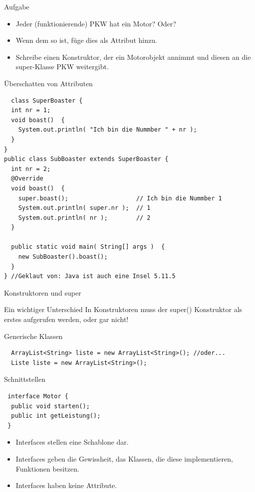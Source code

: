 \documentclass[18pt]{beamer}
\begin{document}
\begin{frame}{Aufgabe}
 \begin{itemize}
  \item Jeder (funktionierende) PKW hat ein Motor? Oder?
  \item Wenn dem so ist, füge dies als Attribut hinzu.
  \item Schreibe einen Konstruktor, der ein Motorobjekt annimmt und diesen an die super-Klasse PKW weitergibt.
 \end{itemize}
\end{frame}

\begin{frame}[fragile]{Überschatten von Attributen}
 \begin{lstlisting}
  class SuperBoaster {
  int nr = 1;
  void boast()  {
    System.out.println( "Ich bin die Nummber " + nr );
  }
}
public class SubBoaster extends SuperBoaster {
  int nr = 2;
  @Override 
  void boast()  {
    super.boast();                   // Ich bin die Nummber 1
    System.out.println( super.nr );  // 1
    System.out.println( nr );        // 2
  }

  public static void main( String[] args )  {
    new SubBoaster().boast();
  }
} //Geklaut von: Java ist auch eine Insel 5.11.5
 \end{lstlisting}
\end{frame}


\begin{frame}{Konstruktoren und super}
 \begin{alertblock}{Ein wichtiger Unterschied}
  In Konstruktoren muss der super() Konstruktor als erstes aufgerufen werden,
  oder gar nicht!
 \end{alertblock}
\end{frame}


\begin{frame}[fragile]{Generische Klassen}
 \begin{lstlisting}
  ArrayList<String> liste = new ArrayList<String>(); //oder...
  Liste liste = new ArrayList<String>();
 \end{lstlisting}
\end{frame}


\begin{frame}[fragile]{Schnittstellen}
\begin{lstlisting}
 interface Motor {
  public void starten();
  public int getLeistung();
 }
 \end{lstlisting}
 \begin{itemize}
  \item Interfaces stellen eine Schablone dar.
  \item Interfaces geben die Gewissheit, das Klassen, die diese implementieren, Funktionen besitzen.
  \item Interfaces haben keine Attribute.
 \end{itemize}

\end{frame}
\end{document}
